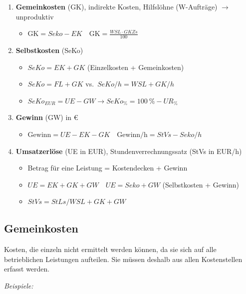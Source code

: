 \begin{enumerate}
\item
  \textbf{Gemeinkosten} (GK), indirekte Kosten, Hilfslöhne (W-Aufträge)
  $\to$ unproduktiv

  \begin{itemize}
  \item
    $\boxed{\text{GK} = Seko - EK} \quad \boxed{\text{GK} = \frac{WSL \cdot GKZs}{100}}$
  \end{itemize}
\item
  \textbf{Selbstkosten} (SeKo)

  \begin{itemize}
  \item
    $\boxed{SeKo = EK + GK}$ (Einzelkosten + Gemeinkosten)
  \item
    $\boxed{SeKo = FL + GK}$ vs.~$\boxed{SeKo/h = WSL + GK/h}$
  \item
    $\boxed{SeKo_{EUR} = UE - GW} \to \boxed{SeKo_\% = 100~\% - UR_\%}$
  \end{itemize}
\item
  \textbf{Gewinn} (GW) in €

  \begin{itemize}
  \item
    $\boxed{\text{Gewinn} = UE - EK - GK} \quad \boxed{\text{Gewinn/h} = StVs - Seko/h}$
  \end{itemize}
\item
  \textbf{Umsatzerlöse} (UE in EUR), Stundenverrechnungssatz (StVs in
  EUR/h)

  \begin{itemize}
  \item
    Betrag für eine Leistung = Kostendecken + Gewinn
  \item
    $\boxed{UE = EK + GK + GW} \quad \boxed{UE = Seko + GW}$
    (Selbstkosten + Gewinn)
  \item
    $\boxed{StVs = StLs/WSL + GK + GW}$
  \end{itemize}
\end{enumerate}

\subsection{Gemeinkosten}\label{gemeinkosten}

Kosten, die einzeln nicht ermittelt werden können, da sie sich auf alle
betrieblichen Leistungen aufteilen. Sie müssen deshalb aus allen
Kostenstellen erfasst werden.

\emph{Beispiele:}

